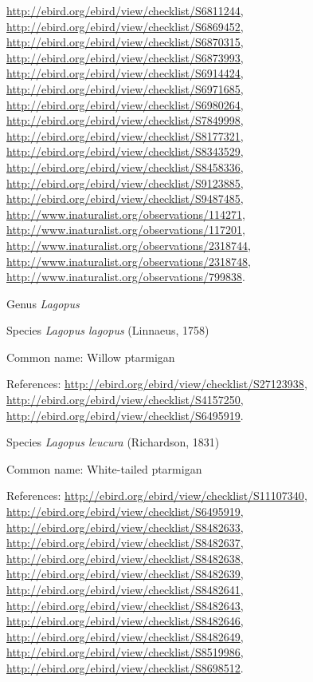 \documentclass[9pt, article]{memoir}
\begin{document}
\begin{multicols}{2}
\url{http://ebird.org/ebird/view/checklist/S6811244}, 
\url{http://ebird.org/ebird/view/checklist/S6869452}, 
\url{http://ebird.org/ebird/view/checklist/S6870315}, 
\url{http://ebird.org/ebird/view/checklist/S6873993}, 
\url{http://ebird.org/ebird/view/checklist/S6914424}, 
\url{http://ebird.org/ebird/view/checklist/S6971685}, 
\url{http://ebird.org/ebird/view/checklist/S6980264}, 
\url{http://ebird.org/ebird/view/checklist/S7849998}, 
\url{http://ebird.org/ebird/view/checklist/S8177321}, 
\url{http://ebird.org/ebird/view/checklist/S8343529}, 
\url{http://ebird.org/ebird/view/checklist/S8458336}, 
\url{http://ebird.org/ebird/view/checklist/S9123885}, 
\url{http://ebird.org/ebird/view/checklist/S9487485}, 
\url{http://www.inaturalist.org/observations/114271}, 
\url{http://www.inaturalist.org/observations/117201}, 
\url{http://www.inaturalist.org/observations/2318744}, 
\url{http://www.inaturalist.org/observations/2318748}, 
\url{http://www.inaturalist.org/observations/799838}.

\vspace{6pt}\noindent\hspace{30pt}Genus \textit{Lagopus}


\vspace{6pt}\noindent\hspace{36pt}Species \textit{Lagopus lagopus} (Linnaeus, 1758)


Common name: Willow ptarmigan

References: 
\url{http://ebird.org/ebird/view/checklist/S27123938}, 
\url{http://ebird.org/ebird/view/checklist/S4157250}, 
\url{http://ebird.org/ebird/view/checklist/S6495919}.

\vspace{6pt}\noindent\hspace{36pt}Species \textit{Lagopus leucura} (Richardson, 1831)


Common name: White-tailed ptarmigan

References: 
\url{http://ebird.org/ebird/view/checklist/S11107340}, 
\url{http://ebird.org/ebird/view/checklist/S6495919}, 
\url{http://ebird.org/ebird/view/checklist/S8482633}, 
\url{http://ebird.org/ebird/view/checklist/S8482637}, 
\url{http://ebird.org/ebird/view/checklist/S8482638}, 
\url{http://ebird.org/ebird/view/checklist/S8482639}, 
\url{http://ebird.org/ebird/view/checklist/S8482641}, 
\url{http://ebird.org/ebird/view/checklist/S8482643}, 
\url{http://ebird.org/ebird/view/checklist/S8482646}, 
\url{http://ebird.org/ebird/view/checklist/S8482649}, 
\url{http://ebird.org/ebird/view/checklist/S8519986}, 
\url{http://ebird.org/ebird/view/checklist/S8698512}.


\end{multicols}
\end{document}
